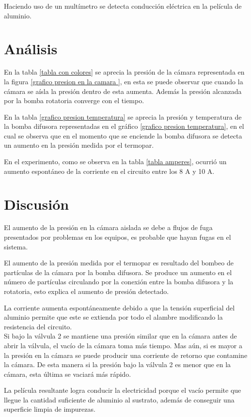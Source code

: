 \documentclass[journal]{IEEEtran}
\begin{document}
 
 Haciendo uso de un multímetro se detecta conducción eléctrica en la película de aluminio.

\section{Análisis}
En la tabla \ref{tabla con colores} se aprecia la presión de la cámara representada en la figura \ref{grafico presion en la camara }, en esta se puede observar que cuando la cámara se aísla la presión dentro de esta aumenta. Además la presión alcanzada por la bomba rotatoria converge con el tiempo.

En la tabla \ref{grafico presion temperatura} se aprecia la presión y temperatura de la bomba difusora representadas en el gráfico \ref{grafico presion temperatura}, en el cual se observa que en el momento que se enciende la bomba difusora se detecta un aumento en la presión medida por el termopar.

En el experimento, como se observa en la tabla \ref{tabla amperes}, ocurrió un aumento espontáneo de la corriente en el circuito entre los 8 A y 10 A.

\section{Discusión }
El aumento de la presión en la cámara aislada se debe a flujos de fuga presentados por problemas en los equipos, es probable que hayan fugas en el sistema.

El aumento de la presión medida por el termopar es resultado del bombeo de partículas de la cámara por la bomba difusora. Se produce un aumento en el número de partículas circulando por la conexión entre la bomba difusora y la rotatoria, esto explica el aumento de presión detectado.

La corriente aumenta espontáneamente debido a que la tensión superficial del aluminio permite que este se extienda por todo el alambre modificando la resistencia del circuito. \\

Si bajo la válvula 2 se mantiene una presión similar que en la cámara antes de abrir la válvula, el vacío de la cámara toma más tiempo. Mas aún, si es mayor a la presión en la cámara se puede producir una corriente de retorno que contamine la cámara. De esta manera si la presión bajo la válvula 2 es menor que en la cámara, esta última se vaciará más rápido.

La película resultante logra conducir la electricidad porque el vacío permite que llegue la cantidad suficiente de aluminio al sustrato, además de conseguir una superficie limpia de impurezas.
\end{document}
